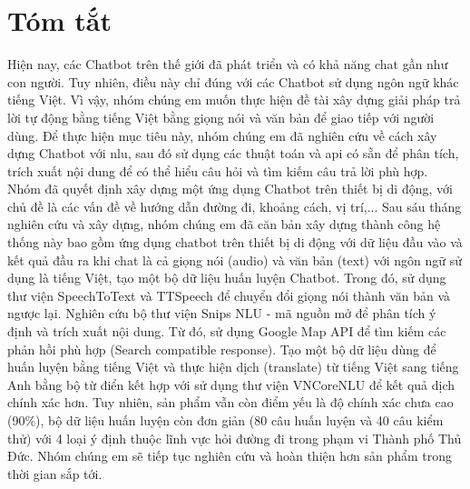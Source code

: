 \chapter*{Tóm tắt}
\label{tomtat}
Hiện nay, các Chatbot trên thế giới đã phát triển và có khả năng chat gần như con người. Tuy nhiên, điều này chỉ đúng với các Chatbot sử dụng ngôn ngữ khác tiếng Việt. Vì vậy, nhóm chúng em muốn thực hiện đề tài xây dựng giải pháp trả lời tự động bằng tiếng Việt bằng giọng nói và văn bản để giao tiếp với người dùng. Để thực hiện mục tiêu này, nhóm chúng em đã nghiên cứu về cách xây dựng Chatbot với \ac{nlu}, sau đó sử dụng các thuật toán và \ac{api} có sẵn để phân tích, trích xuất nội dung để có thể hiểu câu hỏi và tìm kiếm câu trả lời phù hợp. Nhóm đã quyết định xây dựng một ứng dụng Chatbot trên thiết bị di động, với chủ đề là các vấn đề về hướng dẫn đường đi, khoảng cách, vị trí,... Sau sáu tháng nghiên cứu và xây dựng, nhóm chúng em đã căn bản xây dựng thành công hệ thống này bao gồm ứng dụng chatbot trên thiết bị di động với dữ liệu đầu vào và kết quả đầu ra khi chat là cả giọng nói (audio) và văn bản (text) với ngôn ngữ sử dụng là tiếng Việt, tạo một bộ dữ liệu huấn luyện Chatbot. Trong đó, sử dụng thư viện SpeechToText\cite{stt} và TTSpeech\cite{tts} để chuyển đổi giọng nói thành văn bản và ngược lại. Nghiên cứu bộ thư viện Snips NLU\cite{Snipsnlu} - mã nguồn mở để phân tích ý định và trích xuất nội dung. Từ đó, sử dụng Google Map API\cite{ggmaps} để tìm kiếm các phản hồi phù hợp (Search compatible response). Tạo một bộ dữ liệu dùng để huấn luyện bằng tiếng Việt và thực hiện dịch (translate) từ tiếng Việt sang tiếng Anh bằng bộ từ điển kết hợp với sử dụng thư viện VNCoreNLU\cite{vncorenlu} để kết quả dịch chính xác hơn. Tuy nhiên, sản phẩm vẫn còn điểm yếu là độ chính xác chưa cao (90\%), bộ dữ liệu huấn luyện còn đơn giản (80 câu huấn luyện và 40 câu kiểm thử) với 4 loại ý định thuộc lĩnh vực hỏi đường đi trong phạm vi Thành phố Thủ Đức. Nhóm chúng em sẽ tiếp tục nghiên cứu và hoàn thiện hơn sản phẩm trong thời gian sắp tới. 
